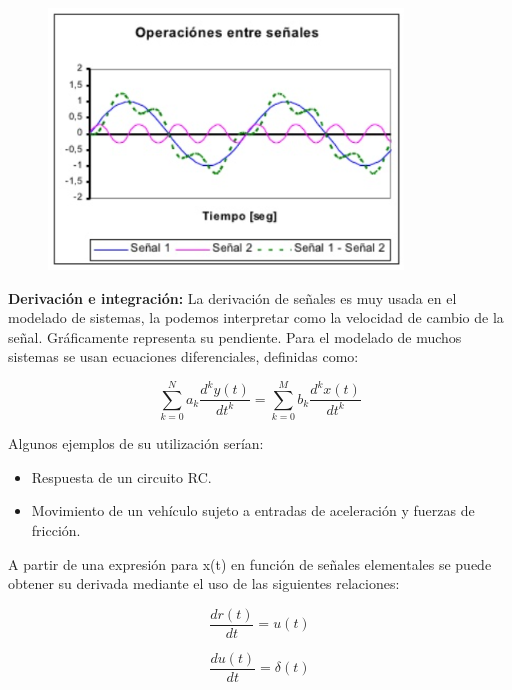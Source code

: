 \documentclass[10pt]{article}
\begin{document}
\begin{figure}[h]
	\includegraphics[scale=0.6]{R}
	\centering
\end{figure}

\textbf{Derivación e integración:}
La derivación de señales es muy usada en el modelado de sistemas, la podemos interpretar como la velocidad de cambio de la señal. Gráficamente representa su pendiente. Para el modelado de muchos sistemas se usan ecuaciones diferenciales, definidas como:

\[
\sum_{k=0}^{N}a_{k} \frac{d^{k}y(t)}{dt^{k}}=\sum_{k=0}^{M}b_{k} \frac{d^{k}x(t)}{dt^{k}}
\]

Algunos ejemplos de su utilización serían:
\begin{itemize}
	\item Respuesta de un circuito RC.
	\item Movimiento de un vehículo sujeto a entradas de aceleración y fuerzas de fricción.
\end{itemize}
A partir de una expresión para x(t) en función de señales elementales se puede obtener su derivada mediante el uso de las siguientes relaciones:

\[
\frac{dr(t)}{dt} = u(t)
\]

\[
\frac{du(t)}{dt} = \delta(t)
\]
\end{document}
